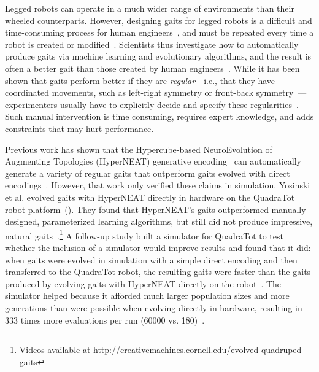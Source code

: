 
Legged robots can operate in a much wider range of environments than their wheeled counterparts. However, designing gaits for legged robots is a difficult and time-consuming process for human engineers~\cite{strom1999legged,wettergreen1992gait}, and must be repeated every time a robot is created or modified~\cite{hornby2005autonomous}. 
Scientists thus investigate how to automatically produce gaits via machine learning and evolutionary algorithms, and the result is often a better gait than those created by human engineers~\cite{hornby2005autonomous,valsalam:mii,kohl:stone,hornby2003generative,yos:clune}. While it has been shown that gaits perform better if they are \emph{regular}---i.e., that they have coordinated movements, such as left-right symmetry or front-back symmetry~\cite{valsalam:mii,clune2011performance,clune2009evolving,clune2009sensitivity}---experimenters usually have to explicitly decide and specify these regularities~\cite{valsalam:mii,tellez,beer,raibert}. 
Such manual intervention is time consuming, requires expert knowledge, and adds constraints that may hurt performance. 

Previous work has shown that the Hypercube-based NeuroEvolution of Augmenting Topologies (HyperNEAT) generative encoding~\cite{stanley2009hypercube} can automatically generate a variety of regular gaits that outperform gaits evolved with direct encodings~\cite{clune2011performance,clune2009evolving}.
However, that work only verified these claims in simulation. 
Yosinski et al. evolved gaits with HyperNEAT directly in hardware on the QuadraTot robot platform~(). They found that HyperNEAT's gaits outperformed manually designed, parameterized learning algorithms, but still did not produce impressive, natural gaits~\cite{yos:clune}.\footnote{Videos available at http://creativemachines.cornell.edu/evolved-quadruped-gaits}
A follow-up study built a simulator for QuadraTot to test whether the inclusion of a simulator would improve results and found that it did:  when gaits were evolved in simulation with a simple direct encoding and then transferred to the QuadraTot robot, the resulting gaits were faster than the gaits produced by evolving gaits with HyperNEAT directly on the robot~\cite{glette}. 
The simulator helped because it afforded much larger population sizes and more generations than were possible when evolving directly in hardware, resulting in 333 times more evaluations per run (60000 vs. 180)~\cite{yos:clune,glette}. 

